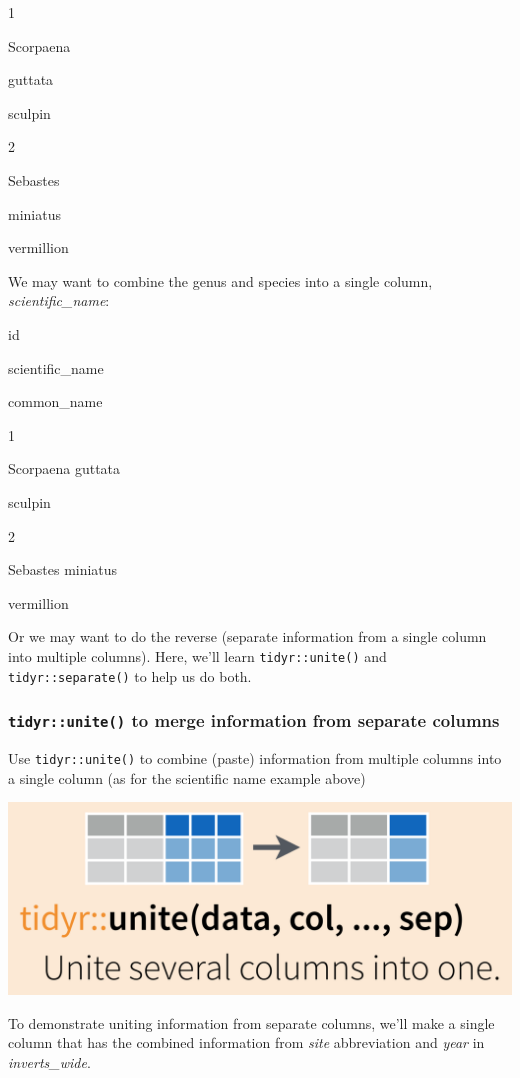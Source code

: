 \documentclass[]{book}
\begin{document}
1

Scorpaena

guttata

sculpin

2

Sebastes

miniatus

vermillion

We may want to combine the genus and species into a single column, \emph{scientific\_name}:

id

scientific\_name

common\_name

1

Scorpaena guttata

sculpin

2

Sebastes miniatus

vermillion

Or we may want to do the reverse (separate information from a single column into multiple columns). Here, we'll learn \texttt{tidyr::unite()} and \texttt{tidyr::separate()} to help us do both.

\hypertarget{tidyrunite-to-merge-information-from-separate-columns}{%
\subsubsection{\texorpdfstring{\texttt{tidyr::unite()} to merge information from separate columns}{tidyr::unite() to merge information from separate columns}}\label{tidyrunite-to-merge-information-from-separate-columns}}

Use \texttt{tidyr::unite()} to combine (paste) information from multiple columns into a single column (as for the scientific name example above)

\includegraphics{img/rstudio-cheatsheet-unite.png}

To demonstrate uniting information from separate columns, we'll make a single column that has the combined information from \emph{site} abbreviation and \emph{year} in \emph{inverts\_wide}.
\end{document}

